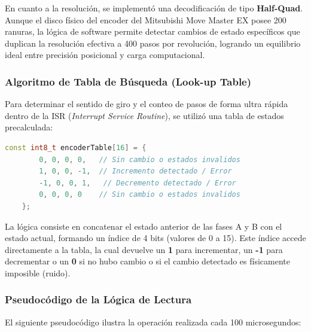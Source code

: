 En cuanto a la resolución, se implementó una decodificación de tipo \textbf{Half-Quad}. Aunque el disco físico del encoder del Mitsubishi Move Master EX posee 200 ranuras, la lógica de software permite detectar cambios de estado específicos que duplican la resolución efectiva a 400 pasos por revolución, logrando un equilibrio ideal entre precisión posicional y carga computacional.

\subsubsection{Algoritmo de Tabla de Búsqueda (Look-up Table)}
Para determinar el sentido de giro y el conteo de pasos de forma ultra rápida dentro de la ISR (\textit{Interrupt Service Routine}), se utilizó una tabla de estados precalculada:

\begin{lstlisting}[language=C++, caption={Tabla de estados para decodificacion de Encoders}, label={lst:encoder_table}]
	const int8_t encoderTable[16] = {
		0, 0, 0, 0,   // Sin cambio o estados invalidos
		1, 0, 0, -1,  // Incremento detectado / Error
		-1, 0, 0, 1,   // Decremento detectado / Error
		0, 0, 0, 0    // Sin cambio o estados invalidos
	};
\end{lstlisting}

La lógica consiste en concatenar el estado anterior de las fases A y B con el estado actual, formando un índice de 4 bits (valores de 0 a 15). Este índice accede directamente a la tabla, la cual devuelve un \textbf{1} para incrementar, un \textbf{-1} para decrementar o un \textbf{0} si no hubo cambio o si el cambio detectado es físicamente imposible (ruido).

\subsubsection{Pseudocódigo de la Lógica de Lectura}
El siguiente pseudocódigo ilustra la operación realizada cada 100 microsegundos:

